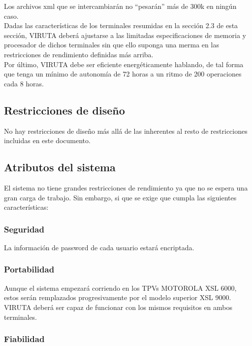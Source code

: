 Los archivos xml que se intercambiarán no ``pesarán'' más de 300k en ningún caso.\\

Dadas las características de los terminales resumidas en la sección 2.3 de esta sección, VIRUTA deberá ajustarse a las limitadas especificaciones de memoria y procesador de dichos terminales sin que ello suponga una merma en las restricciones de rendimiento definidas más arriba.\\

Por último, VIRUTA debe ser eficiente energéticamente hablando, de tal forma que tenga un mínimo de autonomía de 72 horas a un ritmo de 200 operaciones cada 8 horas.

\subsection{Restricciones de diseño}

No hay restricciones de diseño más allá de las inherentes al resto de restricciones incluidas en este documento.

\subsection{Atributos del sistema}

El sistema no tiene grandes restricciones de rendimiento ya que no se espera una gran carga de trabajo. Sin embargo, si que se exige que cumpla las siguientes características:

\subsubsection{Seguridad}

La información de password de cada usuario estará encriptada.

\subsubsection{Portabilidad}

Aunque el sistema empezará corriendo en los TPVs MOTOROLA XSL 6000, estos serán remplazados progresivamente por el modelo superior XSL 9000. VIRUTA deberá ser capaz de funcionar con los mismos requisitos en ambos terminales.

\subsubsection{Fiabilidad}

